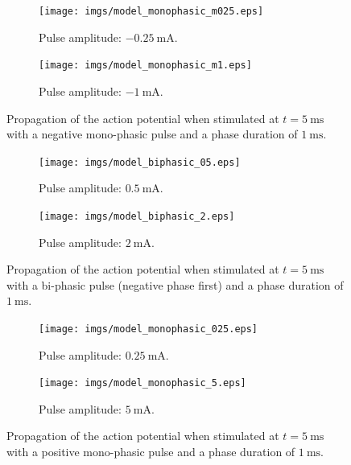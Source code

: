 \documentclass{scrartcl}			%
\begin{document}
\begin{figure}[H] 
  \begin{subfigure}[b]{\linewidth}
    \centering
    \texttt{[image: imgs/model\_monophasic\_m025.eps]}
    \caption{Pulse amplitude: $\SI{-0.25}{\milli\ampere}$.} 
    \label{fig:mm025mA} 
  \end{subfigure}%
  \quad
  \begin{subfigure}[b]{\linewidth}
    \centering
    \texttt{[image: imgs/model\_monophasic\_m1.eps]} 
    \caption{Pulse amplitude: $\SI{-1}{\milli\ampere}$.}
    \label{fig:mm1mA} 
    \end{subfigure} 
  \caption{Propagation of the action potential when stimulated at $t = \SI{5}{\milli\second}$ with a negative mono-phasic pulse and a phase duration of $\SI{1}{\milli\second}$.}
  \label{fig:stim1} 
\end{figure}

\begin{figure}[H] 
	\begin{subfigure}[b]{\linewidth}
    \centering
    \texttt{[image: imgs/model\_biphasic\_05.eps]}
    \caption{Pulse amplitude: $\SI{0.5}{\milli\ampere}$.}
    \label{fig:bi05mA} 
    \end{subfigure} %
    \quad
  \begin{subfigure}[b]{\linewidth}
    \centering
    \texttt{[image: imgs/model\_biphasic\_2.eps]} 
    \caption{Pulse amplitude: $\SI{2}{\milli\ampere}$.}
    \label{fig:bi2mA} 
  \end{subfigure}
  \caption{Propagation of the action potential when stimulated at $t = \SI{5}{\milli\second}$ with a bi-phasic pulse (negative phase first) and a phase duration of $\SI{1}{\milli\second}$.}
  \label{fig:stim_bi}
\end{figure}

\begin{figure}[H] 
  \begin{subfigure}[b]{\linewidth}
    \centering
    \texttt{[image: imgs/model\_monophasic\_025.eps]} 
    \caption{Pulse amplitude: $\SI{0.25}{\milli\ampere}$.}
    \label{fig:m025mA} 
    \end{subfigure} %
    \quad 
    \begin{subfigure}[b]{\linewidth}
    \centering
    \texttt{[image: imgs/model\_monophasic\_5.eps]} 
    \caption{Pulse amplitude: $\SI{5}{\milli\ampere}$.}
    \label{fig:m5mA} 
    \end{subfigure} 
  \caption{Propagation of the action potential when stimulated at $t = \SI{5}{\milli\second}$ with a positive mono-phasic pulse and a phase duration of $\SI{1}{\milli\second}$.}
  \label{fig:stim2} 
\end{figure}
\end{document}
